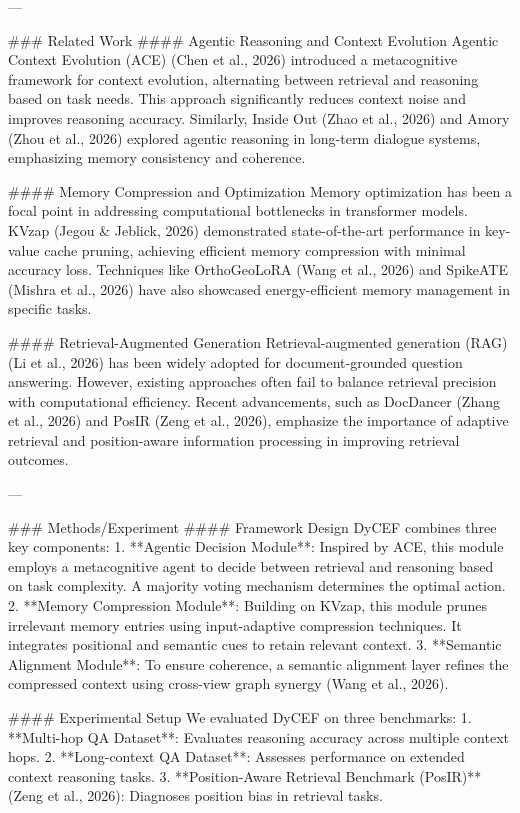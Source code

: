 ---

### Related Work
#### Agentic Reasoning and Context Evolution
Agentic Context Evolution (ACE) (Chen et al., 2026) introduced a metacognitive framework for context evolution, alternating between retrieval and reasoning based on task needs. This approach significantly reduces context noise and improves reasoning accuracy. Similarly, Inside Out (Zhao et al., 2026) and Amory (Zhou et al., 2026) explored agentic reasoning in long-term dialogue systems, emphasizing memory consistency and coherence.

#### Memory Compression and Optimization
Memory optimization has been a focal point in addressing computational bottlenecks in transformer models. KVzap (Jegou & Jeblick, 2026) demonstrated state-of-the-art performance in key-value cache pruning, achieving efficient memory compression with minimal accuracy loss. Techniques like OrthoGeoLoRA (Wang et al., 2026) and SpikeATE (Mishra et al., 2026) have also showcased energy-efficient memory management in specific tasks.

#### Retrieval-Augmented Generation
Retrieval-augmented generation (RAG) (Li et al., 2026) has been widely adopted for document-grounded question answering. However, existing approaches often fail to balance retrieval precision with computational efficiency. Recent advancements, such as DocDancer (Zhang et al., 2026) and PosIR (Zeng et al., 2026), emphasize the importance of adaptive retrieval and position-aware information processing in improving retrieval outcomes.

---

### Methods/Experiment
#### Framework Design
DyCEF combines three key components:
1. **Agentic Decision Module**: Inspired by ACE, this module employs a metacognitive agent to decide between retrieval and reasoning based on task complexity. A majority voting mechanism determines the optimal action.
2. **Memory Compression Module**: Building on KVzap, this module prunes irrelevant memory entries using input-adaptive compression techniques. It integrates positional and semantic cues to retain relevant context.
3. **Semantic Alignment Module**: To ensure coherence, a semantic alignment layer refines the compressed context using cross-view graph synergy (Wang et al., 2026).

#### Experimental Setup
We evaluated DyCEF on three benchmarks:
1. **Multi-hop QA Dataset**: Evaluates reasoning accuracy across multiple context hops.
2. **Long-context QA Dataset**: Assesses performance on extended context reasoning tasks.
3. **Position-Aware Retrieval Benchmark (PosIR)** (Zeng et al., 2026): Diagnoses position bias in retrieval tasks.


